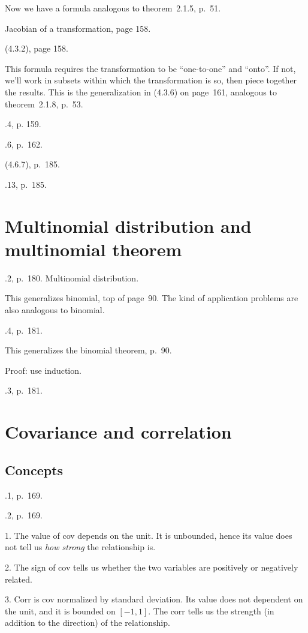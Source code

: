 \documentclass[12pt]{article}
\begin{document}
Now we have a formula analogous to theorem~2.1.5, p.~51.

\alert[Concept]%
Jacobian of a transformation, page 158.

\theorem%
(4.3.2), page 158.

\alert%
This formula requires the transformation to be ``one-to-one''
and ``onto''. If not, we'll work in subsets within which
the transformation is so, then piece together the results.
This is the generalization in (4.3.6) on page~161,
analogous to theorem~2.1.8, p.~53.

.4, p. 159.

.6, p.~162.

\alert[Generalization]%
(4.6.7), p.~185.

.13, p.~185.

\section{Multinomial distribution and multinomial theorem}

.2, p.~180. Multinomial distribution.

This generalizes binomial, top of page~90.
The kind of application problems are also analogous to binomial.

.4, p.~181.

This generalizes the binomial theorem,
p.~90.

Proof: use induction.

.3, p.~181.


\section{Covariance and correlation}
\subsection{Concepts}

.1, p.~169.

.2, p.~169.

\alert%
1. The value of cov depends on the unit. It is unbounded,
hence its value does not tell us \emph{how strong} the relationship is.

2. The sign of cov tells us whether the two variables are positively or
negatively related.

3. Corr is cov normalized by standard deviation.
Its value does not dependent on the unit, and it is bounded on
$[-1,1]$. The corr tells us the strength (in addition to the direction)
of the relationship.
\end{document}
